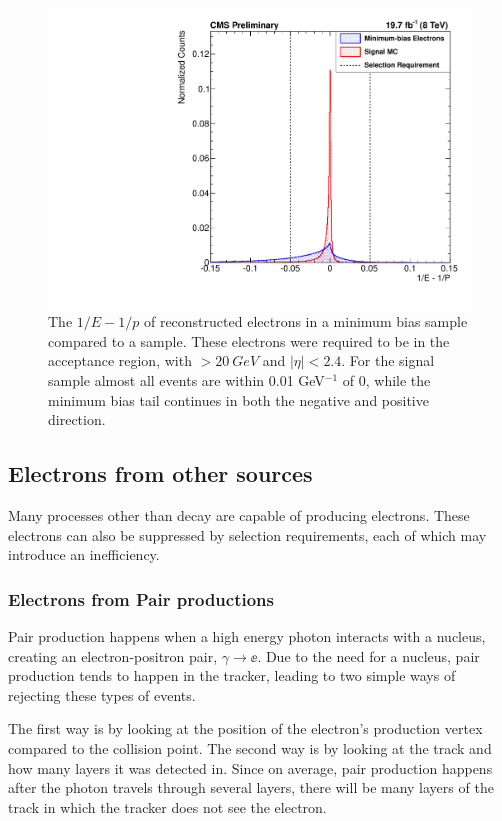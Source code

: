 \begin{figure}[!htbp]
    \centering
    \includegraphics[width=\linewidth]{figures/EventSelection/AlexsEventSelectionFigures/e_reco_var_1oe_1op.pdf}
    \caption{The $1/E-1/p$ of reconstructed electrons in a minimum bias sample compared to a \MADGRAPH \Ztoee sample. These electrons were required to be in the acceptance region, with \pt $>\SI{20}{GeV}$ and $|\eta|<2.4$. For the signal sample almost all events are within 0.01 GeV$^{-1}$ of 0, while the minimum bias tail continues in both the negative and positive direction.}
    \label{fig:InverseEnMinusInverseMom}
\end{figure}
\subsection{Electrons from other sources}
Many processes other than \Z decay are capable of producing electrons. These electrons can also be suppressed by selection requirements, each of which may introduce an inefficiency.
\subsubsection{Electrons from Pair productions}
Pair production happens when a high energy photon interacts with a nucleus, creating an electron-positron pair, $\gamma\rightarrow\ee$. Due to the need for a nucleus, pair production tends to happen in the tracker, leading to two simple ways of rejecting these types of events.

The first way is by looking at the position of the electron's production vertex compared to the collision point. The second way is by looking at the track and how many layers it was detected in. Since on average, pair production happens after the photon travels through several layers, there will be many layers of the track in which the tracker does not see the electron. 

